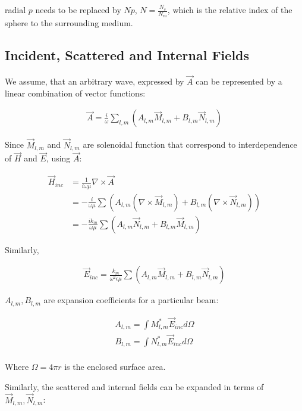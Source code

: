         radial $p$ needs to be replaced by $Np$, $N = \frac{N_s}{N_m}$, which is the relative index of the sphere to the surrounding
        medium.


    \subsection{Incident, Scattered and Internal Fields}
        We assume, that an arbitrary wave, expressed by $\vec{A}$ can be represented by a linear combination of vector functions:

        \begin{align}
            \vec{A} = \frac{i}{\omega}\sum_{l,m}\left(A_{l,m}\vec{M}_{l,m}+B_{l,m}\vec{N}_{l,m}\right)
        \end{align}

        Since $\vec{M}_{l,m}$ and $\vec{N}_{l,m}$ are solenoidal function that correspond to interdependence of $\vec{H}$ and $\vec{E}$, using $\vec{A}$:

        \begin{align}
            \vec{H}_{inc} &= \frac{1}{i\omega \mu}\nabla \times \vec{A} \\
            &= - \frac{i}{\omega\mu}\sum\left(A_{l,m}(\nabla\times\vec{M}_{l,m}) + B_{l,m}(\nabla\times\vec{N}_{l,m})\right) \\
            &= - \frac{ik_m}{\omega\mu}\sum\left(A_{l,m}\vec{N}_{l,m}+B_{l,m}\vec{M}_{l,m}\right)
        \end{align}

        Similarly,

        \begin{align}
            \vec{E}_{inc} = \frac{k_m}{\omega^2\epsilon\mu}\sum\left(A_{l,m}\vec{M}_{l,m} + B_{l,m}\vec{N}_{l,m}\right)
        \end{align}

        $A_{l,m}, B_{l,m}$ are expansion coefficients for a particular beam:

        \begin{align}
            A_{l,m} = \int M^*_{l,m}\vec{E}_{inc}d\Omega \\
            B_{l,m} = \int N^*_{l,m}\vec{E}_{inc}d\Omega \\
        \end{align}

        Where $\Omega = 4\pi r$ is the enclosed surface area.

        Similarly, the scattered and internal fields can be expanded in terms of $\vec{M}_{l,m}, \vec{N}_{l,m}$:

